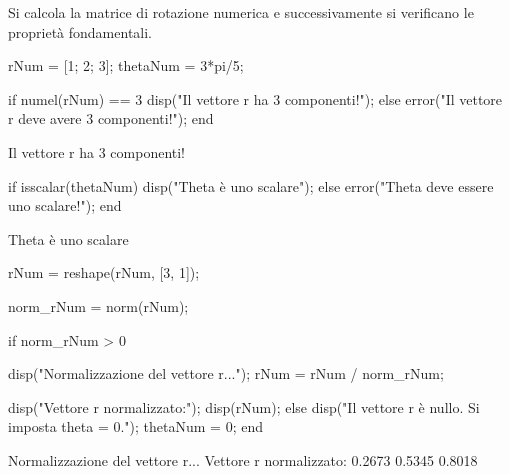 \documentclass[11pt, a4paper]{article}
\begin{document}
\begin{par}
\begin{flushleft}
Si calcola la matrice di rotazione numerica e successivamente si verificano le proprietà fondamentali.
\end{flushleft}
\end{par}

\begin{matlabcode}
rNum = [1; 2; 3];
thetaNum = 3*pi/5;

if numel(rNum) == 3
    disp("Il vettore r ha 3 componenti!");
else
    error("Il vettore r deve avere 3 componenti!");
end
\end{matlabcode}
\begin{matlaboutput}
Il vettore r ha 3 componenti!
\end{matlaboutput}
\begin{matlabcode}

if isscalar(thetaNum)
    disp("Theta è uno scalare");
else
    error("Theta deve essere uno scalare!");
end
\end{matlabcode}
\begin{matlaboutput}
Theta è uno scalare
\end{matlaboutput}
\begin{matlabcode}

rNum = reshape(rNum, [3, 1]);

norm_rNum = norm(rNum);


if norm_rNum > 0

    disp("Normalizzazione del vettore r...");
    rNum = rNum / norm_rNum;

    disp("Vettore r normalizzato:");
    disp(rNum);
else
    disp("Il vettore r è nullo. Si imposta theta = 0.");
    thetaNum = 0;
end
\end{matlabcode}
\begin{matlaboutput}
Normalizzazione del vettore r...
Vettore r normalizzato:
    0.2673
    0.5345
    0.8018
\end{matlaboutput}
\end{document}
